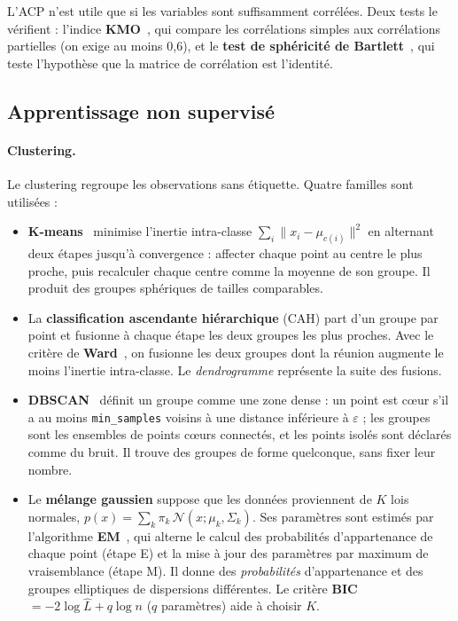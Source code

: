 L'ACP n'est utile que si les variables sont suffisamment corrélées. Deux tests le vérifient : l'indice \textbf{KMO}~\cite{kaiser1974}, qui compare les corrélations simples aux corrélations partielles (on exige au moins 0,6), et le \textbf{test de sphéricité de Bartlett}~\cite{bartlett1950}, qui teste l'hypothèse que la matrice de corrélation est l'identité.

\subsection{Apprentissage non supervisé}

\paragraph{Clustering.} Le clustering regroupe les observations sans étiquette. Quatre familles sont utilisées :
\begin{itemize}
  \item \textbf{K-means}~\cite{lloyd1982} minimise l'inertie intra-classe $\sum_i \lVert x_i - \mu_{c(i)}\rVert^2$ en alternant deux étapes jusqu'à convergence : affecter chaque point au centre le plus proche, puis recalculer chaque centre comme la moyenne de son groupe. Il produit des groupes sphériques de tailles comparables.
  \item La \textbf{classification ascendante hiérarchique} (CAH) part d'un groupe par point et fusionne à chaque étape les deux groupes les plus proches. Avec le critère de \textbf{Ward}~\cite{ward1963}, on fusionne les deux groupes dont la réunion augmente le moins l'inertie intra-classe. Le \emph{dendrogramme} représente la suite des fusions.
  \item \textbf{DBSCAN}~\cite{ester1996} définit un groupe comme une zone dense : un point est \og cœur \fg{} s'il a au moins \texttt{min\_samples} voisins à une distance inférieure à $\varepsilon$ ; les groupes sont les ensembles de points cœurs connectés, et les points isolés sont déclarés comme du bruit. Il trouve des groupes de forme quelconque, sans fixer leur nombre.
  \item Le \textbf{mélange gaussien} suppose que les données proviennent de $K$ lois normales, $p(x) = \sum_k \pi_k\,\mathcal{N}(x;\mu_k,\Sigma_k)$. Ses paramètres sont estimés par l'algorithme \textbf{EM}~\cite{dempster1977}, qui alterne le calcul des probabilités d'appartenance de chaque point (étape E) et la mise à jour des paramètres par maximum de vraisemblance (étape M). Il donne des \emph{probabilités} d'appartenance et des groupes elliptiques de dispersions différentes. Le critère \textbf{BIC} $= -2\log \hat L + q\log n$ ($q$ paramètres) aide à choisir $K$.
\end{itemize}

